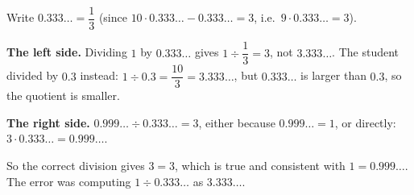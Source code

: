 Write $0.333\ldots=\dfrac{1}{3}$ (since $10\cdot0.333\ldots-0.333\ldots=3$, i.e.\ $9\cdot0.333\ldots=3$).

\textbf{The left side.} Dividing $1$ by $0.333\ldots$ gives $1\div\dfrac{1}{3}=3$, not $3.333\ldots$. The student divided by $0.3$ instead: $1\div0.3=\dfrac{10}{3}=3.333\ldots$, but $0.333\ldots$ is larger than $0.3$, so the quotient is smaller.

\textbf{The right side.} $0.999\ldots\div0.333\ldots=3$, either because $0.999\ldots=1$, or directly: $3\cdot0.333\ldots=0.999\ldots$.

So the correct division gives $\boxed{3=3}$, which is true and consistent with $1=0.999\ldots$. The error was computing $1\div0.333\ldots$ as $3.333\ldots$.
